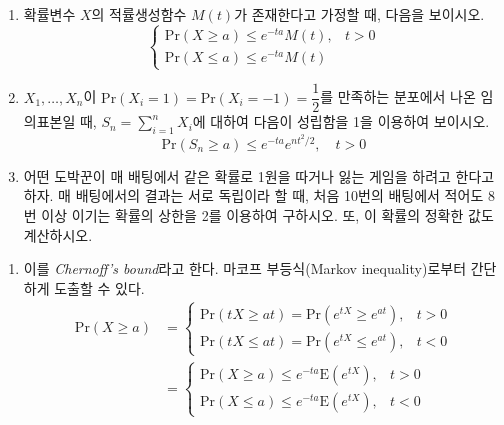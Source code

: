 \documentclass[answers]{exam}
\begin{document}
\newpage
{}
\begin{questions}
   \question
   \begin{enumerate}
    \item 확률변수 $X$의 적률생성함수 $M\left(t\right)$가 존재한다고 가정할 때, 다음을 보이시오.
    $$
      \begin{cases}\mathrm{Pr}\left(X\geq a\right)\leq e^{-ta}M\left(t\right), & t>0\\ \mathrm{Pr}\left(X \leq a\right)\leq e^{-ta}M\left(t\right) \end{cases}
    $$
    \item $X_{1},\ldots,X_{n}$이 $\mathrm{Pr}\left(X_{i}=1\right)=\mathrm{Pr}\left(X_{i}=-1\right)=\dfrac{1}{2}$를 만족하는 분포에서 나온 임의표본일 때, $S_{n}=\sum_{i=1}^{n}X_{i}$에 대하여 다음이 성립함을 1을 이용하여 보이시오.
    $$
      \mathrm{Pr}\left(S_{n}\geq a\right)\leq e^{-ta}e^{nt^{2}/2}, \quad t>0
    $$
    \item 어떤 도박꾼이 매 배팅에서 같은 확률로 1원을 따거나 잃는 게임을 하려고 한다고 하자. 매 배팅에서의 결과는 서로 독립이라 할 때, 처음 10번의 배팅에서 적어도 8번 이상 이기는 확률의 상한을 2를 이용하여 구하시오. 또, 이 확률의 정확한 값도 계산하시오.
   \end{enumerate}
   \begin{solution}
    \begin{enumerate}
      \item 이를 \emph{Chernoff's bound}라고 한다. 마코프 부등식(Markov inequality)로부터 간단하게 도출할 수 있다.
      \begin{align}
        \mathrm{Pr}\left(X\geq a\right) &=\begin{cases} \mathrm{Pr}\left(tX\geq at\right)=\mathrm{Pr}\left(e^{tX}\geq e^{at}\right), & t>0\\\mathrm{Pr}\left(tX \leq at\right)= \mathrm{Pr}\left(e^{tX} \leq e^{at}\right), & t<0 \end{cases}\\
        &= \begin{cases}\mathrm{Pr}\left(X\geq a\right)\leq e^{-ta}\mathrm{E}\left(e^{tX}\right),& t>0\\\mathrm{Pr}\left(X\leq a\right)\leq e^{-ta}\mathrm{E}\left(e^{tX}\right), & t<0  \end{cases}
      \end{align}

\end{enumerate}
\end{solution}
\end{questions}
\end{document}
